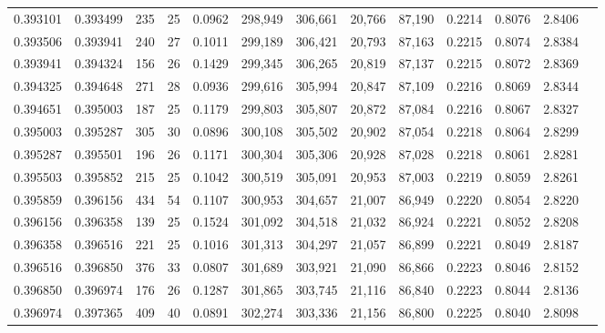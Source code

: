\begin{tabular}{rrrrrrrrrrrrr}
0.393101 & 0.393499 &   235 &  25 &                                     0.0962 & 298,949 & 306,661 &  20,766 &  87,190 & 0.2214 & 0.8076 & 2.8406 \\
0.393506 & 0.393941 &   240 &  27 &                                     0.1011 & 299,189 & 306,421 &  20,793 &  87,163 & 0.2215 & 0.8074 & 2.8384 \\
0.393941 & 0.394324 &   156 &  26 &                                     0.1429 & 299,345 & 306,265 &  20,819 &  87,137 & 0.2215 & 0.8072 & 2.8369 \\
0.394325 & 0.394648 &   271 &  28 &                                     0.0936 & 299,616 & 305,994 &  20,847 &  87,109 & 0.2216 & 0.8069 & 2.8344 \\
0.394651 & 0.395003 &   187 &  25 &                                     0.1179 & 299,803 & 305,807 &  20,872 &  87,084 & 0.2216 & 0.8067 & 2.8327 \\
0.395003 & 0.395287 &   305 &  30 &                                     0.0896 & 300,108 & 305,502 &  20,902 &  87,054 & 0.2218 & 0.8064 & 2.8299 \\
0.395287 & 0.395501 &   196 &  26 &                                     0.1171 & 300,304 & 305,306 &  20,928 &  87,028 & 0.2218 & 0.8061 & 2.8281 \\
0.395503 & 0.395852 &   215 &  25 &                                     0.1042 & 300,519 & 305,091 &  20,953 &  87,003 & 0.2219 & 0.8059 & 2.8261 \\
0.395859 & 0.396156 &   434 &  54 &                                     0.1107 & 300,953 & 304,657 &  21,007 &  86,949 & 0.2220 & 0.8054 & 2.8220 \\
0.396156 & 0.396358 &   139 &  25 &                                     0.1524 & 301,092 & 304,518 &  21,032 &  86,924 & 0.2221 & 0.8052 & 2.8208 \\
0.396358 & 0.396516 &   221 &  25 &                                     0.1016 & 301,313 & 304,297 &  21,057 &  86,899 & 0.2221 & 0.8049 & 2.8187 \\
0.396516 & 0.396850 &   376 &  33 &                                     0.0807 & 301,689 & 303,921 &  21,090 &  86,866 & 0.2223 & 0.8046 & 2.8152 \\
0.396850 & 0.396974 &   176 &  26 &                                     0.1287 & 301,865 & 303,745 &  21,116 &  86,840 & 0.2223 & 0.8044 & 2.8136 \\
0.396974 & 0.397365 &   409 &  40 &                                     0.0891 & 302,274 & 303,336 &  21,156 &  86,800 & 0.2225 & 0.8040 & 2.8098 \\

\end{tabular}
